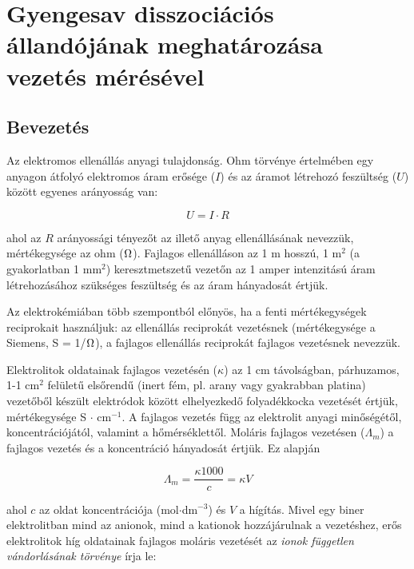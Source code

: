 \fancyhead[LO,RE]{\thesection}
\fancyfoot[LE,RO]{\thepage}

\setcounter{section}{1}
\section{Gyengesav disszociációs állandójának meghatározása vezetés mérésével}
\subsection{Bevezetés}
Az elektromos ellenállás anyagi tulajdonság.
Ohm törvénye értelmében egy anyagon átfolyó elektromos áram erősége ($I$) és az áramot létrehozó feszültség ($U$) között egyenes arányosság van:

\begin{equation}
\label{eq:ohm}
	U
	=
	I
	\cdot
	R
\end{equation}

ahol az $R$ arányossági tényezőt az illető anyag ellenállásának nevezzük, mértékegysége az ohm ($\ohm$).
Fajlagos ellenálláson az 1 m hosszú, 1 m$^2$ (a gyakorlatban 1 mm$^2$) keresztmetszetű vezetőn az 1 amper intenzitású áram létrehozásához szükséges feszültség és az áram hányadosát értjük.

Az elektrokémiában több szempontból előnyös, ha a fenti mértékegységek reciprokait használjuk: az ellenállás reciprokát vezetésnek (mértékegysége a Siemens, S = 1/$\ohm$), a fajlagos ellenállás reciprokát fajlagos vezetésnek nevezzük.

Elektrolitok oldatainak fajlagos vezetésén ($\kappa$) az 1 cm távolságban, párhuzamos, 1-1 cm$^2$ felületű elsőrendű (inert fém, pl. arany vagy gyakrabban platina) vezetőből készült elektródok között elhelyezkedő folyadékkocka vezetését értjük, mértékegysége S $\cdot$ cm$^{-1}$.
A fajlagos vezetés függ az elektrolit anyagi minőségétől, koncentrációjától, valamint a hőmérséklettől.
Moláris fajlagos vezetésen ($\Lambda _m$) a fajlagos vezetés és a koncentráció hányadosát értjük. Ez alapján

\begin{equation}
\label{eq:lambdam}
        \Lambda_m
        =
        \frac
		{\kappa 1000 }
		{c}
	=
	\kappa V
\end{equation}

ahol $c$ az oldat koncentrációja (mol$\cdot$dm$^{-3}$) és $V$ a hígítás.
Mivel egy biner elektrolitban mind az anionok, mind a kationok hozzájárulnak a vezetéshez, erős elektrolitok híg oldatainak fajlagos moláris vezetését az \emph{ionok független vándorlásának törvénye} írja le:

